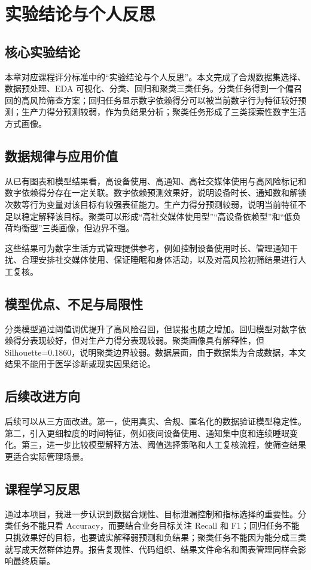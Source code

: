 \chapter{实验结论与个人反思}

\section{核心实验结论}

本章对应课程评分标准中的“实验结论与个人反思”。本文完成了合规数据集选择、数据预处理、EDA 可视化、分类、回归和聚类三类任务。分类任务得到一个偏召回的高风险筛查方案；回归任务显示数字依赖得分可以被当前数字行为特征较好预测；生产力得分预测较弱，作为负结果分析；聚类任务形成了三类探索性数字生活方式画像。

\section{数据规律与应用价值}

从已有图表和模型结果看，高设备使用、高通知、高社交媒体使用与高风险标记和数字依赖得分存在一定关联。数字依赖预测效果好，说明设备时长、通知数和解锁次数等行为变量对该目标有较强表征能力。生产力得分预测较弱，说明当前特征不足以稳定解释该目标。聚类可以形成“高社交媒体使用型”“高设备依赖型”和“低负荷均衡型”三类画像，但边界不强。

这些结果可为数字生活方式管理提供参考，例如控制设备使用时长、管理通知干扰、合理安排社交媒体使用、保证睡眠和身体活动，以及对高风险初筛结果进行人工复核。

\section{模型优点、不足与局限性}

分类模型通过阈值调优提升了高风险召回，但误报也随之增加。回归模型对数字依赖得分表现较好，但对生产力得分表现较弱。聚类画像具有解释性，但 Silhouette=0.1860，说明聚类边界较弱。数据层面，由于数据集为合成数据，本文结果不能用于医学诊断或现实因果结论。

\section{后续改进方向}

后续可以从三方面改进。第一，使用真实、合规、匿名化的数据验证模型稳定性。第二，引入更细粒度的时间特征，例如夜间设备使用、通知集中度和连续睡眠变化。第三，进一步比较模型解释方法、阈值选择策略和人工复核流程，使筛查结果更适合实际管理场景。

\section{课程学习反思}

通过本项目，我进一步认识到数据合规性、目标泄漏控制和指标选择的重要性。分类任务不能只看 Accuracy，而要结合业务目标关注 Recall 和 F1；回归任务不能只挑效果好的目标，也要诚实解释弱预测和负结果；聚类任务不能因为能分成三类就写成天然群体边界。报告复现性、代码组织、结果文件命名和图表管理同样会影响最终质量。
